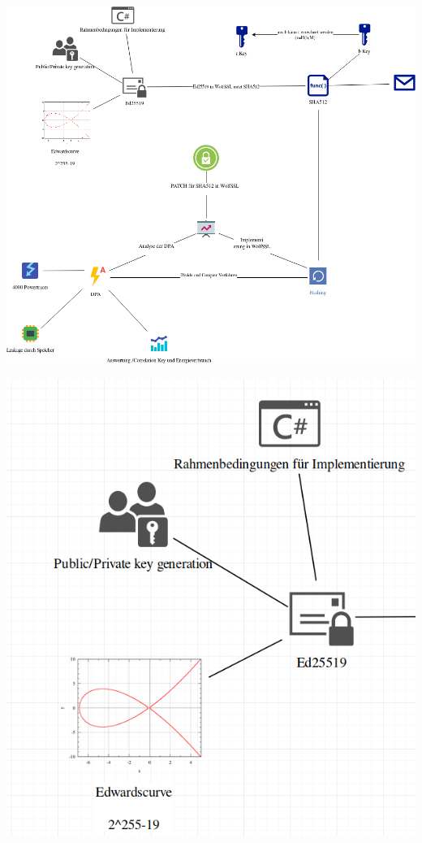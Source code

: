 \documentclass[
  9pt,
  ignorenonframetext,
  aspectratio=169,
]{beamer}
\begin{document}
\begin{frame}{}
\protect\hypertarget{section}{}
\includegraphics{Abbildungen/ITSEC(1).png}
\end{frame}

\begin{frame}{}
\protect\hypertarget{section-1}{}
\includegraphics{Abbildungen/Punkt1.png}
\end{frame}
\end{document}

